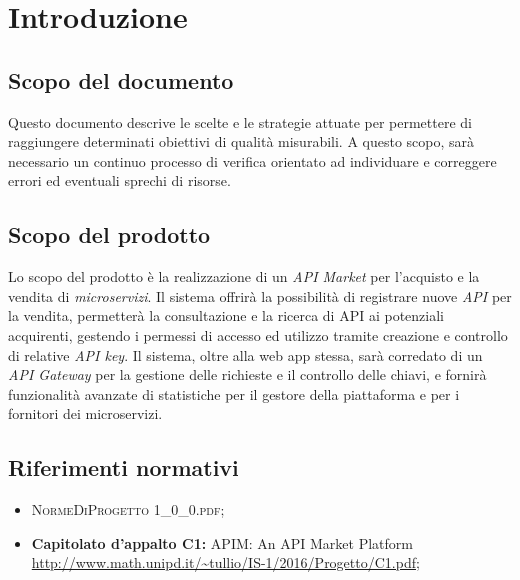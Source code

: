\newpage
\section{Introduzione}

\subsection{Scopo del documento}
Questo documento descrive le scelte e le strategie attuate per permettere di raggiungere determinati obiettivi di qualità misurabili. A questo scopo, sarà necessario un continuo processo di verifica orientato ad individuare e correggere errori ed eventuali sprechi di risorse.

\subsection{Scopo del prodotto}
Lo scopo del prodotto è la realizzazione di un \textit{API Market} per l'acquisto e la vendita di \textit{microservizi}. Il sistema offrirà la possibilità di registrare nuove \textit{API} per la vendita, permetterà la consultazione e la ricerca di API ai potenziali acquirenti, gestendo i permessi di accesso ed utilizzo tramite creazione e controllo di relative \textit{API key}. Il sistema, oltre alla web app stessa, sarà corredato di un \textit{API Gateway} per la gestione delle richieste e il controllo delle chiavi, e fornirà funzionalità avanzate di statistiche per il gestore della piattaforma e per i fornitori dei microservizi.

\subsection{Riferimenti normativi}
\begin{itemize}
\item \textsc{NormeDiProgetto 1\_0\_0.pdf};
\item \textbf{Capitolato d’appalto C1:} APIM: An API Market Platform\\ \url{http://www.math.unipd.it/~tullio/IS-1/2016/Progetto/C1.pdf};
\end{itemize}

